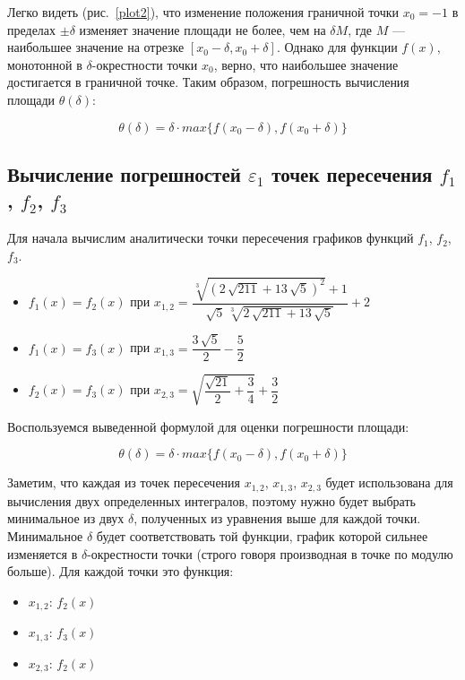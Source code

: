 \documentclass[a4paper,12pt,titlepage,finall]{article}
\begin{document}
Легко видеть (рис.~\ref{plot2}), что изменение положения граничной точки $x_0=-1$ в пределах $\pm\delta$ изменяет значение площади не более, чем на $\delta M$, где $M$ — наибольшее значение на отрезке $[x_0-\delta,x_0+\delta]$. Однако для функции $f(x)$, монотонной в $\delta$-окрестности точки $x_0$, верно, что наибольшее значение достигается в граничной точке. Таким образом, погрешность вычисления площади $\theta(\delta)$:

 $$\theta(\delta)= \delta \cdot max\{f(x_0-\delta), f(x_0+\delta)\}$$

\subsection{Вычисление погрешностей $\varepsilon_1$ точек пересечения $f_1$, $f_2$, $f_3$}

Для начала вычислим аналитически точки пересечения графиков функций $f_1$, $f_2$, $f_3$. 

\begin{itemize}
	\item $f_1(x)=f_2(x)$ при $x_{1,2}=\dfrac{\sqrt[{3}]{\left(2\,\sqrt{211}+13\,\sqrt{5}\right)^{2}}+1}{\sqrt{5}\,\sqrt[{3}]{2\,\sqrt{211}+13\,\sqrt{5}}}+2$
	\item $f_1(x)=f_3(x)$ при $x_{1,3}=\dfrac{3\,\sqrt{5}}{2}-\dfrac{5}{2}$
	\item $f_2(x)=f_3(x)$ при $x_{2,3}=\sqrt{\dfrac{\sqrt{21}}{2}+\dfrac{3}{4}}+\dfrac{3}{2}$
\end{itemize}

Воспользуемся выведенной формулой для оценки погрешности площади:

 $$\theta(\delta)= \delta \cdot max\{f(x_0-\delta), f(x_0+\delta)\}$$

Заметим, что каждая из точек пересечения $x_{1,2}$, $x_{1,3}$, $x_{2,3}$ будет использована для вычисления двух определенных интегралов, поэтому нужно будет выбрать минимальное из двух $\delta$, полученных из уравнения выше для каждой точки. Минимальное $\delta$ будет соответствовать той функции, график которой сильнее изменяется в $\delta$-окрестности точки (строго говоря производная в точке по модулю больше). Для каждой точки это функция:

\begin{itemize}
	\item[] $x_{1,2}$: $f_2(x)$
	\item[] $x_{1,3}$: $f_3(x)$
	\item[] $x_{2,3}$: $f_2(x)$
\end{itemize}
\end{document}
